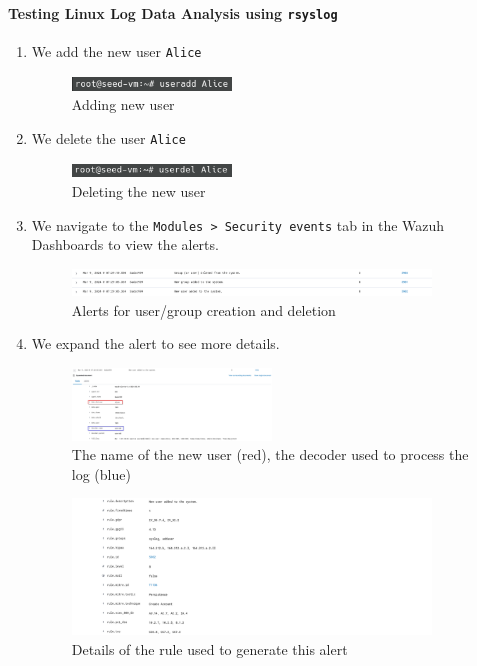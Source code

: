 \paragraph{Testing Linux Log Data Analysis using \texttt{rsyslog}}
\begin{enumerate}
    \item We add the new user \texttt{Alice}
    \begin{figure} [H]
    \centering
    \includegraphics[width=0.4\textwidth]{images/log-data/7.png}
    \caption{Adding new user}
    \end{figure}
    \item We delete the user \texttt{Alice}
    \begin{figure} [H]
    \centering
    \includegraphics[width=0.4\textwidth]{images/log-data/8.png}
    \caption{Deleting the new user}
    \end{figure}
    \item We navigate to the \texttt{Modules > Security events} tab in the Wazuh Dashboards to view the alerts. 
    \begin{figure} [H]
    \centering
    \includegraphics[width=0.9\textwidth]{images/log-data/4.png}
    \caption{Alerts for user/group creation and deletion}
    \end{figure}
    \item We expand the alert to see more details.
    \begin{figure} [H]
    \centering
    \includegraphics[width=0.5\textwidth]{images/log-data/5.png}
    \caption{The name of the new user (red), the decoder used to process the log (blue)}
    \end{figure}
    \begin{figure} [H]
    \centering
    \includegraphics[width=0.9\textwidth]{images/log-data/6.png}
    \caption{Details of the rule used to generate this alert}
    \end{figure}
\end{enumerate}


